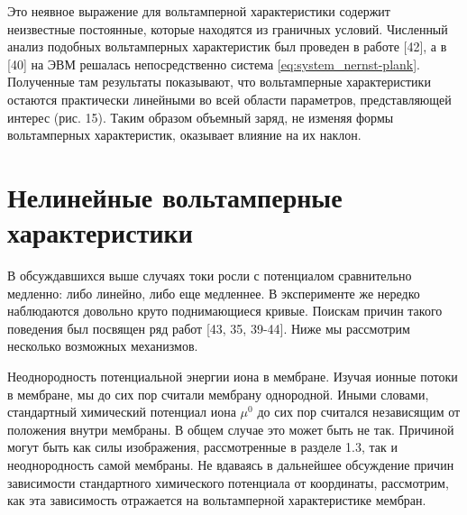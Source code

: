 Это неявное выражение для вольтамперной характеристики содержит неизвестные
постоянные, которые находятся из граничных условий. Численный анализ подобных
вольтамперных характеристик был проведен в работе [42], а в [40] на ЭВМ решалась
непосредственно система \eqref{eq:system_nernst-plank}. Полученные там
результаты показывают, что вольтамперные характеристики остаются практически
линейными во всей области параметров, представляющей интерес (рис. 15).
Таким образом объемный заряд, не изменяя формы вольтамперных характеристик,
оказывает влияние на их наклон.

\section{Нелинейные вольтамперные характеристики}
В обсуждавшихся выше случаях токи росли с потенциалом сравнительно медленно:
либо линейно, либо еще медленнее. В эксперименте же нередко наблюдаются довольно
круто поднимающиеся кривые. Поискам причин такого поведения был посвящен ряд
работ [43, 35, 39-44]. Ниже мы рассмотрим несколько возможных механизмов.

Неоднородность потенциальной энергии иона в мембране. Изучая ионные потоки в
мембране, мы до сих пор считали мембрану однородной. Иными словами, стандартный
химический потенциал иона \(\mu^0\) до сих пор считался независящим от положения
внутри мембраны. В общем случае это может быть не так. Причиной могут быть как
силы изображения, рассмотренные в разделе 1.3, так и неоднородность самой
мембраны. Не вдаваясь в дальнейшее обсуждение причин зависимости стандартного
химического потенциала от координаты, рассмотрим, как эта зависимость отражается
на вольтамперной характеристике мембран.

